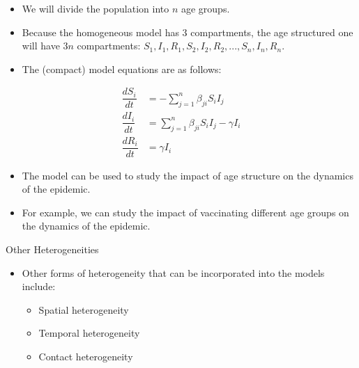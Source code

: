 \documentclass[
  ignorenonframetext,
]{beamer}
\providecommand{\tightlist}{%
  \setlength{\itemsep}{0pt}\setlength{\parskip}{0pt}}\usepackage{longtable,booktabs,array}
\begin{document}
\begin{frame}
\begin{itemize}
\item
  We will divide the population into \(n\) age groups.
\item
  Because the homogeneous model has 3 compartments, the age structured
  one will have \(3n\) compartments:
  \(S_1, I_1, R_1, S_2, I_2, R_2, ..., S_n, I_n, R_n\).
\end{itemize}
\end{frame}

\begin{frame}
\begin{itemize}
\tightlist
\item
  The (compact) model equations are as follows:
\end{itemize}

\begin{align}
\dfrac{dS_i}{dt} &= -\sum_{j=1}^{n} \beta_{ji} S_i I_j \\
\dfrac{dI_i}{dt} &= \sum_{j=1}^{n} \beta_{ji} S_i I_j - \gamma I_i \\
\dfrac{dR_i}{dt} &= \gamma I_i
\end{align}
\end{frame}

\begin{frame}
\begin{itemize}
\item
  The model can be used to study the impact of age structure on the
  dynamics of the epidemic.
\item
  For example, we can study the impact of vaccinating different age
  groups on the dynamics of the epidemic.
\end{itemize}
\end{frame}

\begin{frame}
\begin{block}{Other Heterogeneities}
\label{other-heterogeneities}
\begin{itemize}
\item
  Other forms of heterogeneity that can be incorporated into the models
  include:

  \begin{itemize}
  \tightlist
  \item
    Spatial heterogeneity
  \item
    Temporal heterogeneity
  \item
    Contact heterogeneity
  \end{itemize}
\end{itemize}
\end{block}
\end{frame}
\end{document}
